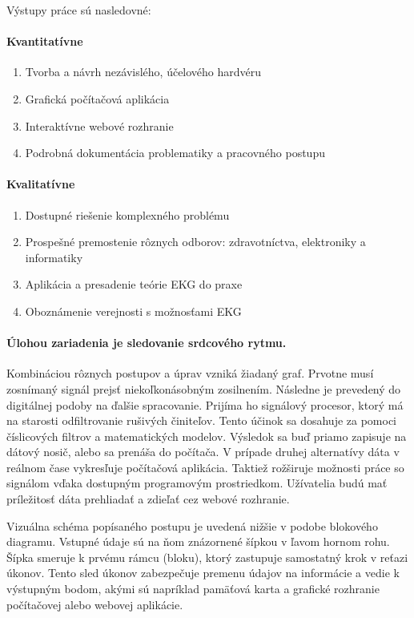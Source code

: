 \documentclass[titlepage,12pt]{article}
\begin{document}
Výstupy práce sú nasledovné:
\paragraph{\textbf{Kvantitatívne}}
\begin{enumerate}
	\item Tvorba a návrh nezávislého, účelového hardvéru
	\item Grafická počítačová aplikácia
	\item Interaktívne webové rozhranie
	\item Podrobná dokumentácia problematiky a pracovného postupu
\end{enumerate}
\paragraph{\textbf{Kvalitatívne}}
\begin{enumerate}
	\item Dostupné riešenie komplexného problému
	\item Prospešné premostenie rôznych odborov: zdravotníctva, elektroniky a informatiky
	\item Aplikácia a presadenie teórie EKG do praxe
	\item Oboznámenie verejnosti s možnosťami EKG
\end{enumerate}


\paragraph{Úlohou zariadenia je sledovanie srdcového rytmu.} Kombináciou rôznych postupov a úprav vzniká žiadaný graf. Prvotne musí zosnímaný signál prejsť niekoľkonásobným zosilnením. Následne je prevedený do digitálnej podoby na ďalšie spracovanie. Prijíma ho signálový procesor, ktorý má na starosti odfiltrovanie rušivých činiteľov. Tento účinok sa dosahuje za pomoci číslicových filtrov a matematických modelov. Výsledok sa buď priamo zapisuje na dátový nosič, alebo sa prenáša do počítača. V prípade druhej alternatívy dáta v reálnom čase vykresľuje počítačová aplikácia. Taktiež rožširuje možnosti práce so signálom vďaka dostupným programovým prostriedkom. Užívatelia budú mať príležitosť dáta prehliadať a zdieľať cez webové rozhranie.

Vizuálna schéma popísaného postupu je uvedená nižšie v podobe blokového diagramu. \linebreak Vstupné údaje sú na ňom znázornené šípkou v ľavom hornom rohu. Šípka smeruje k prvému rámcu (bloku), ktorý zastupuje samostatný krok v reťazi úkonov. Tento sled úkonov zabezpečuje premenu údajov na informácie a vedie k výstupným bodom, akými sú napríklad pamäťová karta a grafické rozhranie počítačovej alebo webovej aplikácie.
\end{document}
